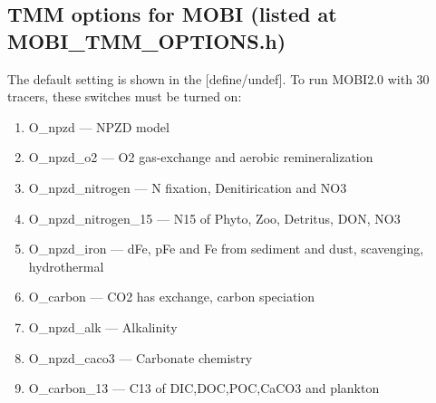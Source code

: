 \documentclass[a4paper]{article}
\begin{document}
\subsection{TMM options for MOBI (listed at MOBI\_TMM\_OPTIONS.h)} \label{subsection:mobi_options}
The default setting is shown in the [define/undef]. To run MOBI2.0 with 30 tracers, these switches must be turned on:
\begin{enumerate}
\item O\_npzd --- NPZD model
\item O\_npzd\_o2 --- O2 gas-exchange and aerobic remineralization
\item O\_npzd\_nitrogen --- N fixation, Denitirication and NO3 
\item O\_npzd\_nitrogen\_15 --- N15 of Phyto, Zoo, Detritus, DON, NO3
\item O\_npzd\_iron --- dFe, pFe and Fe from sediment and dust, scavenging, hydrothermal
\item O\_carbon --- CO2 has exchange, carbon speciation
\item O\_npzd\_alk --- Alkalinity
\item O\_npzd\_caco3 --- Carbonate chemistry
\item O\_carbon\_13 --- C13 of DIC,DOC,POC,CaCO3 and plankton
\end{enumerate}
\end{document}
